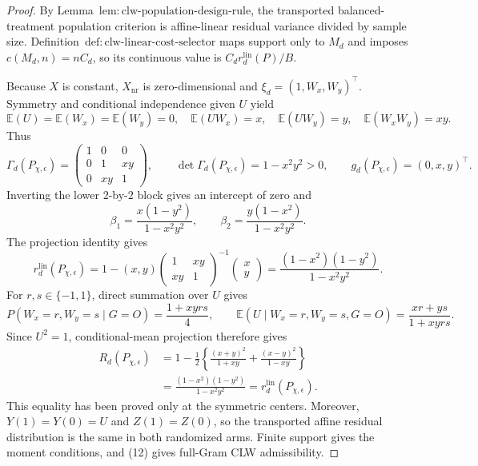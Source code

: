 \documentclass{article}
\begin{document}
\begin{proof}
By Lemma~\(\mathrm{lem{:}clw\text{-}population\text{-}design\text{-}rule}\), the transported balanced-treatment population criterion is affine-linear residual variance divided by sample size.  Definition~\(\mathrm{def{:}clw\text{-}linear\text{-}cost\text{-}selector}\) maps support only to \(M_d\) and imposes \(c(M_d,n)=nC_d\), so its continuous value is \(C_dr_d^{\mathrm{lin}}(P)/B\).

Because \(X\) is constant, \(X_{\mathrm{nr}}\) is zero-dimensional and \(\xi_d=(1,W_x,W_y)^\top\).  Symmetry and conditional independence given \(U\) yield
\[
 \mathbb E(U)=\mathbb E(W_x)=\mathbb E(W_y)=0,
 \quad \mathbb E(UW_x)=x,
 \quad \mathbb E(UW_y)=y,
 \quad \mathbb E(W_xW_y)=xy.                              \tag{11}
\]
Thus
\[
 \Gamma_d(P_{\chi,\epsilon})=
 \begin{pmatrix}1&0&0\\0&1&xy\\0&xy&1\end{pmatrix},
 \qquad
 \det\Gamma_d(P_{\chi,\epsilon})=1-x^2y^2>0,
 \qquad
 g_d(P_{\chi,\epsilon})=(0,x,y)^\top.                    \tag{12}
\]
Inverting the lower \(2\)-by-\(2\) block gives an intercept of zero and
\[
 \beta_1=\frac{x(1-y^2)}{1-x^2y^2},
 \qquad
 \beta_2=\frac{y(1-x^2)}{1-x^2y^2}.                       \tag{13}
\]
The projection identity gives
\[
 r_d^{\mathrm{lin}}(P_{\chi,\epsilon})
 =1-(x,y)
 \begin{pmatrix}1&xy\\xy&1\end{pmatrix}^{-1}
 \begin{pmatrix}x\\y\end{pmatrix}
 =\frac{(1-x^2)(1-y^2)}{1-x^2y^2}.                        \tag{14}
\]
For \(r,s\in\{-1,1\}\), direct summation over \(U\) gives
\[
 P(W_x=r,W_y=s\mid G=O)=\frac{1+xyrs}{4},
 \qquad
 \mathbb E(U\mid W_x=r,W_y=s,G=O)=\frac{xr+ys}{1+xyrs}.
\]
Since \(U^2=1\), conditional-mean projection therefore gives
\[
\begin{aligned}
 R_d(P_{\chi,\epsilon})
 &=1-\frac12\left\{
 \frac{(x+y)^2}{1+xy}+\frac{(x-y)^2}{1-xy}\right\}\\
 &=\frac{(1-x^2)(1-y^2)}{1-x^2y^2}
 =r_d^{\mathrm{lin}}(P_{\chi,\epsilon}).                 \tag{15}
\end{aligned}
\]
This equality has been proved only at the symmetric centers.  Moreover, \(Y(1)=Y(0)=U\) and \(Z(1)=Z(0)\), so the transported affine residual distribution is the same in both randomized arms.  Finite support gives the moment conditions, and (12) gives full-Gram CLW admissibility.


\end{proof}
\end{document}

